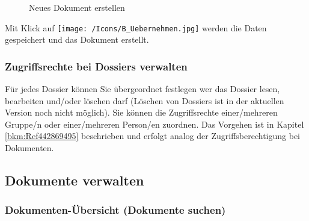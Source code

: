 \begin{figure}[H]
\caption{Neues Dokument erstellen}
\end{figure}

Mit Klick auf \texttt{[image: /Icons/B\_Uebernehmen.jpg]} werden die Daten gespeichert und das Dokument erstellt.

\vspace{\baselineskip}

\subsubsection{Zugriffsrechte bei Dossiers verwalten}
\label{bkm:Ref442273510}
Für jedes Dossier können Sie übergeordnet festlegen wer das Dossier lesen, bearbeiten und/oder löschen darf (Löschen von Dossiers ist in der aktuellen Version noch nicht möglich). Sie können die Zugriffsrechte einer/mehreren Gruppe/n oder einer/mehreren Person/en zuordnen. Das Vorgehen ist in Kapitel \ref{bkm:Ref442869495} beschrieben und erfolgt analog der Zugriffsberechtigung bei Dokumenten.

\pagebreak
\subsection{Dokumente verwalten}
\label{bkm:Ref442273482}

\subsubsection{Dokumenten-Übersicht (Dokumente suchen)}
\label{bkm:Ref443047823}

